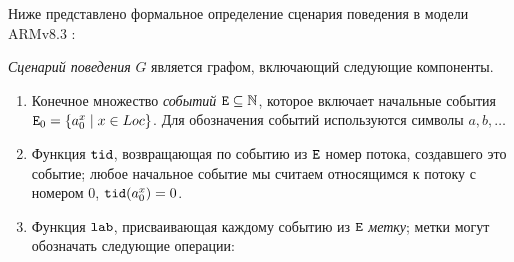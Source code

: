 Ниже представлено формальное определение сценария поведения в
модели ARMv8.3 \cite{Pulte-al:POPL18}:
\begin{definition}
\label{def:execution}
\emph{Сценарий поведения} $G$ является графом, включающий следующие компоненты.
\begin{enumerate}
\item Конечное множество \emph{событий} ${\mathtt{E}} \subseteq \mathbb{N}$, которое включает 
      начальные события ${\mathtt{E}}_0 = \{ a^x_0 \; | \; x \in Loc \}$.
      Для обозначения событий используются символы $a,b,\ldots$
\item Функция ${\mathtt{tid}}$, возвращающая по событию из ${\mathtt{E}}$  номер потока, создавшего это событие;
любое начальное событие мы считаем относящимся к потоку с номером 0, ${\mathtt{tid}}(a^x_0) = 0$.
\item Функция ${\mathtt{lab}}$, присваивающая каждому событию из ${\mathtt{E}}$ \emph{метку}; метки могут обозначать следующие операции: 
      

\end{enumerate}
\end{definition}
